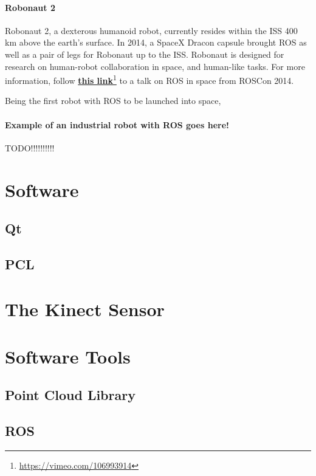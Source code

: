 \paragraph{Robonaut 2}

Robonaut 2, a dexterous humanoid robot, currently resides within the \ac{ISS} 400 km above the earth's surface. In 2014, a SpaceX Dracon capsule brought \ac{ROS} as well as a pair of legs for Robonaut up to the \ac{ISS}\cite{ROS_space}. Robonaut is designed for research on human-robot collaboration in space, and human-like tasks. For more information, follow \href{https://vimeo.com/106993914}{\textbf{this link}}\footnote{\url{https://vimeo.com/106993914}} to a talk on \ac{ROS} in space from ROSCon 2014.

Being the first robot with \ac{ROS} to be launched into space, 

\paragraph{Example of an industrial robot with ROS goes here!}

TODO!!!!!!!!!!

\section{Software}

\subsection{Qt}

\subsection{PCL}

\section{The Kinect Sensor}

\section{Software Tools}

\subsection{Point Cloud Library}

\subsection{ROS}

